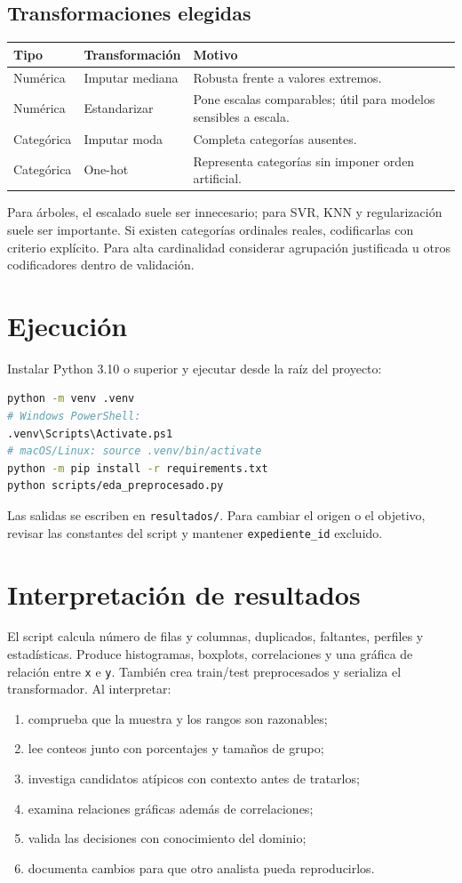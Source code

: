 \documentclass[11pt,a4paper]{article}
\begin{document}
\subsection{Transformaciones elegidas}
\begin{center}
\begin{tabular}{@{}lll@{}}
\toprule Tipo & Transformación & Motivo\\\midrule
Numérica & Imputar mediana & Robusta frente a valores extremos.\\
Numérica & Estandarizar & Pone escalas comparables; útil para modelos sensibles a escala.\\
Categórica & Imputar moda & Completa categorías ausentes.\\
Categórica & One-hot & Representa categorías sin imponer orden artificial.\\\bottomrule
\end{tabular}
\end{center}
Para árboles, el escalado suele ser innecesario; para SVR, KNN y regularización suele ser importante. Si existen categorías ordinales reales, codificarlas con criterio explícito. Para alta cardinalidad considerar agrupación justificada u otros codificadores dentro de validación.
\section{Ejecución}
Instalar Python 3.10 o superior y ejecutar desde la raíz del proyecto:
\begin{lstlisting}[language=bash,basicstyle=\ttfamily\small,backgroundcolor=\color{codebg},frame=single]
python -m venv .venv
# Windows PowerShell:
.venv\Scripts\Activate.ps1
# macOS/Linux: source .venv/bin/activate
python -m pip install -r requirements.txt
python scripts/eda_preprocesado.py
\end{lstlisting}
Las salidas se escriben en \texttt{resultados/}. Para cambiar el origen o el objetivo, revisar las constantes del script y mantener \texttt{expediente\_id} excluido.
\section{Interpretación de resultados}
El script calcula número de filas y columnas, duplicados, faltantes, perfiles y estadísticas. Produce histogramas, boxplots, correlaciones y una gráfica de relación entre \texttt{x} e \texttt{y}. También crea train/test preprocesados y serializa el transformador.
Al interpretar:
\begin{enumerate}
\item comprueba que la muestra y los rangos son razonables;
\item lee conteos junto con porcentajes y tamaños de grupo;
\item investiga candidatos atípicos con contexto antes de tratarlos;
\item examina relaciones gráficas además de correlaciones;
\item valida las decisiones con conocimiento del dominio;
\item documenta cambios para que otro analista pueda reproducirlos.
\end{enumerate}
\end{document}
